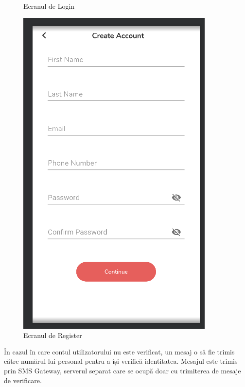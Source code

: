 \documentclass[12pt]{article}
\begin{document}
\begin{figure}[H]
\begin{minipage}[b]{0.4\textwidth}
      \caption{Ecranul de Login}
    \end{minipage}
    \hfill
    \begin{minipage}[b]{0.4\textwidth}
      \includegraphics[width=\textwidth]{register.png}
      \caption{Ecranul de Register}
    \end{minipage}
  \end{figure}

În cazul în care contul utilizatorului nu este verificat, un mesaj o să fie trimis
către numărul lui personal pentru a își verifică identitatea. Mesajul este trimis
prin SMS Gateway, serverul separat care se ocupă doar cu trimiterea de mesaje de verificare.
\end{document}
